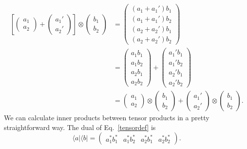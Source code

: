 \documentclass[pra,12pt]{revtex4-2}
\begin{document}
\begin{align}
  \left[\begin{pmatrix} a_1 \\ a_2 \end{pmatrix}
    + \begin{pmatrix} a_1' \\ a_2' \end{pmatrix} \right]
  \otimes \begin{pmatrix} b_1 \\ b_2 \end{pmatrix}
  &=
  \begin{pmatrix} (a_1+a_1') b_1 \\ (a_1+a_1') b_2 \\
    (a_2+a_2') b_1 \\ (a_2+a_2') b_2 \end{pmatrix} \\
  &=
  \begin{pmatrix} a_1 b_1 \\ a_1 b_2 \\ a_2 b_1 \\ a_2 b_2 \end{pmatrix}
  + \begin{pmatrix} a_1' b_1 \\ a_1' b_2 \\ a_2' b_1 \\ a_2' b_2 \end{pmatrix}\\
  &= \begin{pmatrix} a_1 \\ a_2 \end{pmatrix} \otimes
  \begin{pmatrix} b_1 \\ b_2 \end{pmatrix}
  + \begin{pmatrix} a_1' \\ a_2' \end{pmatrix} \otimes
  \begin{pmatrix} b_1 \\ b_2 \end{pmatrix}.
\end{align}
We can calculate inner products between tensor products in a pretty
straightforward way.  The dual of Eq.~\eqref{tensordef} is
\begin{equation}
  \langle a| \langle b| =
  \begin{pmatrix} a_1^* b_1^* & a_1^* b_2^*
    & a_2^* b_1^* & a_2^* b_2^* \end{pmatrix}.
\end{equation}
\end{document}
